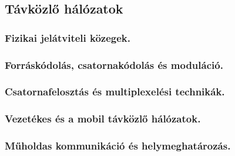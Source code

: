 \subsection{Távközlő hálózatok}
\subsubsection{Fizikai jelátviteli közegek.}

\subsubsection{Forráskódolás, csatornakódolás és moduláció.}

\subsubsection{Csatornafelosztás és multiplexelési technikák.}

\subsubsection{Vezetékes és a mobil távközlő hálózatok.}

\subsubsection{Műholdas kommunikáció és helymeghatározás.}
